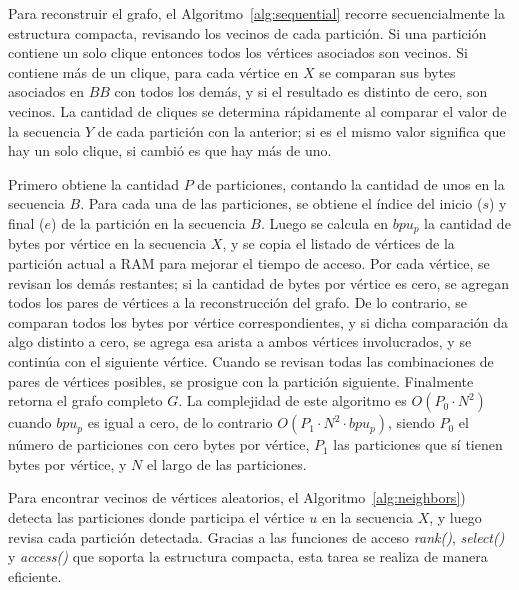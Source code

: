 Para reconstruir el grafo, el Algoritmo~\ref{alg:sequential} recorre secuencialmente la estructura compacta, revisando los vecinos de cada partición. Si una partición contiene un solo clique entonces todos los vértices asociados son vecinos. Si contiene más de un clique, para cada vértice en $X$ se comparan sus bytes asociados en $BB$ con todos los demás, y si el resultado es distinto de cero, son vecinos. La cantidad de cliques se determina rápidamente al comparar el valor de la secuencia $Y$ de cada partición con la anterior; si es el mismo valor significa que hay un solo clique, si cambió es que hay más de uno.

Primero obtiene la cantidad $P$ de particiones, contando la cantidad de unos en la secuencia $B$. Para cada una de las particiones, se obtiene el índice del inicio ($s$) y final ($e$) de la partición en la secuencia $B$. Luego se calcula en $bpu_{p}$ la cantidad de bytes por vértice en la secuencia $X$, y se copia el listado de vértices de la partición actual a RAM para mejorar el tiempo de acceso. Por cada vértice, se revisan los demás restantes; si la cantidad de bytes por vértice es cero, se agregan todos los pares de vértices a la reconstrucción del grafo. De lo contrario, se comparan todos los bytes por vértice correspondientes, y si dicha comparación da algo distinto a cero, se agrega esa arista a ambos vértices involucrados, y se continúa con el siguiente vértice. Cuando se revisan todas las combinaciones de pares de vértices posibles, se prosigue con la partición siguiente. Finalmente retorna el grafo completo $G$.  La complejidad de este algoritmo es $O(P_{0} \cdot N^{2})$ cuando $bpu_{p}$ es igual a cero, de lo contrario $O(P_{1} \cdot N^{2} \cdot bpu_{p})$, siendo $P_{0}$ el número de particiones con cero bytes por vértice, $P_{1}$ las particiones que sí tienen bytes por vértice, y $N$ el largo de las particiones.

Para encontrar vecinos de vértices aleatorios, el Algoritmo~\ref{alg:neighbors}) detecta las particiones donde participa el vértice $u$ en la secuencia $X$, y luego revisa cada partición detectada. Gracias a las funciones de acceso \textit{rank()}, \textit{select()} y \textit{access()} que soporta la estructura compacta, esta tarea se realiza de manera eficiente.

